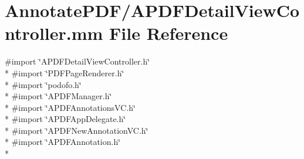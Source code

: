 \hypertarget{_a_p_d_f_detail_view_controller_8mm}{\section{Annotate\-P\-D\-F/\-A\-P\-D\-F\-Detail\-View\-Controller.mm File Reference}
\label{_a_p_d_f_detail_view_controller_8mm}
}
{\ttfamily \#import \char`\"{}A\-P\-D\-F\-Detail\-View\-Controller.\-h\char`\"{}}\\*
{\ttfamily \#import \char`\"{}P\-D\-F\-Page\-Renderer.\-h\char`\"{}}\\*
{\ttfamily \#import \char`\"{}podofo.\-h\char`\"{}}\\*
{\ttfamily \#import \char`\"{}A\-P\-D\-F\-Manager.\-h\char`\"{}}\\*
{\ttfamily \#import \char`\"{}A\-P\-D\-F\-Annotations\-V\-C.\-h\char`\"{}}\\*
{\ttfamily \#import \char`\"{}A\-P\-D\-F\-App\-Delegate.\-h\char`\"{}}\\*
{\ttfamily \#import \char`\"{}A\-P\-D\-F\-New\-Annotation\-V\-C.\-h\char`\"{}}\\*
{\ttfamily \#import \char`\"{}A\-P\-D\-F\-Annotation.\-h\char`\"{}}\\*
